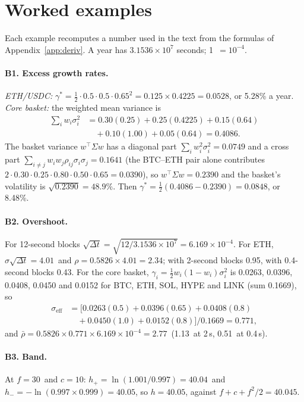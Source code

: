 \section{Worked examples}
\label{app:ex}

Each example recomputes a number used in the text from the formulas of Appendix~\ref{app:deriv}. A year has $3.1536\times10^{7}$ seconds; 1\bps\ $=10^{-4}$.

\paragraph{B1. Excess growth rates.} \emph{ETH/USDC:} $\gamma^{*}=\tfrac12\cdot0.5\cdot0.5\cdot0.65^2=0.125\times0.4225=0.0528$, or 5.28\% a year. \emph{Core basket:} the weighted mean variance is
\[
\begin{aligned}\textstyle\sum_iw_i\sigma_i^2&=0.30(0.25)+0.25(0.4225)+0.15(0.64)\\&\quad+0.10(1.00)+0.05(0.64)=0.4086 .\end{aligned}
\]
The basket variance $w^{\top}\Sigma w$ has a diagonal part $\sum_iw_i^2\sigma_i^2=0.0749$ and a cross part $\sum_{i\ne j}w_iw_j\rho_{ij}\sigma_i\sigma_j=0.1641$ (the BTC--ETH pair alone contributes $2\cdot0.30\cdot0.25\cdot0.80\cdot0.50\cdot0.65=0.0390$), so $w^{\top}\Sigma w=0.2390$ and the basket's volatility is $\sqrt{0.2390}=48.9\%$. Then $\gamma^{*}=\tfrac12(0.4086-0.2390)=0.0848$, or 8.48\%.

\paragraph{B2. Overshoot.} For 12-second blocks $\sqrt{\Delta t}=\sqrt{12/3.1536\times10^{7}}=6.169\times10^{-4}$. For ETH, $\sigma\sqrt{\Delta t}=4.01$\bps\ and $\rho=0.5826\times4.01=2.34$\bps; with 2-second blocks 0.95\bps, with 0.4-second blocks 0.43\bps. For the core basket, $\gamma_i=\tfrac12w_i(1-w_i)\sigma_i^2$ is 0.0263, 0.0396, 0.0408, 0.0450 and 0.0152 for BTC, ETH, SOL, HYPE and LINK (sum 0.1669), so
\[
\begin{aligned}\sigma_{\mathrm{eff}}&=\big[0.0263(0.5)+0.0396(0.65)+0.0408(0.8)\\&\quad+0.0450(1.0)+0.0152(0.8)\big]/0.1669=0.771,\end{aligned}
\]
and $\bar\rho=0.5826\times0.771\times6.169\times10^{-4}=2.77$\bps\ (1.13\bps\ at 2\,s, 0.51\bps\ at 0.4\,s).

\paragraph{B3. Band.} At $f=30$\bps\ and $c=10$\bps: $h_+=\ln(1.001/0.997)=40.04$\bps\ and $h_-=-\ln(0.997\times0.999)=40.05$\bps, so $h=40.05$\bps, against $f+c+f^2/2=40.045$\bps.


